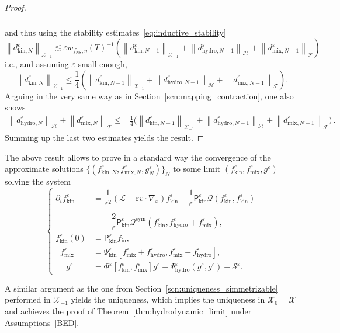 \documentclass[10pt]{amsart}
\theoremstyle{definition}\newtheorem{defi}[theo]{Definition}\newtheorem{rema}[theo]{Remark}\newtheorem{exam}[theo]{Example}\newtheorem{exem}[theo]{Example}\newtheorem{nota}[theo]{Notation}
\newcommand{\ini}{\mathrm{in}}
\newcommand{\ns}{\mathrm{NS}}
\newcommand{\hyd}{\mathrm{hydro}}
\newcommand{\mix}{\mathrm{mix}}
\newcommand{\kin}{\mathrm{kin}}
\newcommand{\sym}{\mathrm{sym}}
\newcommand{\LL}{\mathcal{L}}
\newcommand{\PP}{\mathsf{P}}
\newcommand{\QQ}{\mathcal{Q}}
\renewcommand{\SS}{\mathcal{S}}
\newcommand{\FFF}{\mathscr{F}}
\newcommand{\HHH}{\mathscr{H}}
\newcommand{\GGG}{\mathscr{X}}
\newcommand{\SSSs}{\HHH}
\newcommand{\SSSl}{\GGG}
\newcommand{\SSSh}{\pmb{\GGG}}
\newcommand{\SSSm}{\FFF}
\renewcommand*\le{\leqslant}
\newcommand*\eps{{\varepsilon}}
\begin{document}
\begin{proof}
\begin{multline*}
\begin{aligned}
\end{aligned}
\end{multline*}
and thus using the stability estimates~\eqref{eq:inductive_stability}
\[
\left\| d^\eps_{\kin, N} \right\|_{ \SSSh_{-1} } \lesssim \eps w_{ f_\ns, \eta }(T)^{-1} \left(\left\| d^\eps_{\kin, N-1} \right\|_{ \SSSh_{-1}} + \left\| d^\eps_{\hyd, N-1} \right\|_{\SSSs} + \left\| d^\eps_{\mix, N-1} \right\|_{\SSSm} \right)
\]
i.e., and assuming $\eps$ small enough,
\[
\left\| d^\eps_{\kin, N} \right\|_{ \SSSh_{-1} } \le \frac{1}{4} \left(\left\| d^\eps_{\kin, N-1} \right\|_{ \SSSh_{-1}} + \left\| d^\eps_{\hyd, N-1} \right\|_{\SSSs} + \left\| d^\eps_{\mix, N-1} \right\|_{\SSSm} \right).
\]
Arguing in the very same way as in Section~\ref{scn:mapping_contraction}, one also shows
\begin{align*}
\left\| d^\eps_{\hyd, N} \right\|_{ \SSSs } + \left\| d^\eps_{\mix, N} \right\|_{ \SSSm } \le & \frac{1}{4} \bigg(\left\| d^\eps_{\kin, N-1} \right\|_{\SSSh_{-1}} + \left\| d^\eps_{\hyd, N-1} \right\|_{\SSSs} + \left\| d^\eps_{\mix, N-1} \right\|_{\SSSm} \bigg)\,.
\end{align*}
Summing up the last two estimates yields the result.
\end{proof}

The above result allows to prove in a standard way the convergence of the approximate solutions $\{(f^\eps_{\kin, N}, f^\eps_{\mix, N}, g^\eps_N)\}_N$ to some limit $(f^\eps_{\kin}, f^\eps_{\mix}, g^\eps)$ solving the system
\begin{equation*}
\begin{cases}
\partial_t f^\eps_\kin &= \dfrac{1}{\eps^2} \left(\LL - \eps v \cdot \nabla_x\right) f^\eps_\kin  + \dfrac{1}{\eps} \PP^\eps_\kin \QQ\left(f^\eps_\kin, f^\eps_\kin\right)\\ \\
 &\quad + \dfrac{2}{\eps} \PP^\eps_\kin \QQ^\sym\left(f^\eps_\kin, f^\eps_\hyd + f^\eps_\mix\right), \\
 f^\eps_\kin(0) &= \PP^\eps_\kin f_\ini,\\
\;\; f^\eps_\mix &= \Psi^\eps_\kin\left[f^\eps_\mix + f^\eps_\hyd, f^\eps_\mix + f^\eps_\hyd \right],\\
\quad\; g^\eps &= \Phi^\eps\left[f^\eps_\kin, f^\eps_\mix\right] g^\eps + \Psi^\eps_\hyd\left(g^\eps, g^\eps\right) + \SS^\eps.
\end{cases}
\end{equation*}

A similar argument as the one from Section~\ref{scn:uniqueness_simmetrizable} performed in $\SSSh_{-1}$ yields the uniqueness, which implies the uniqueness in $\SSSh_{0} = \SSSl$ and achieves the proof of Theorem~\ref{thm:hydrodynamic_limit} under Assumptions~\ref{BED}.
\end{document}
